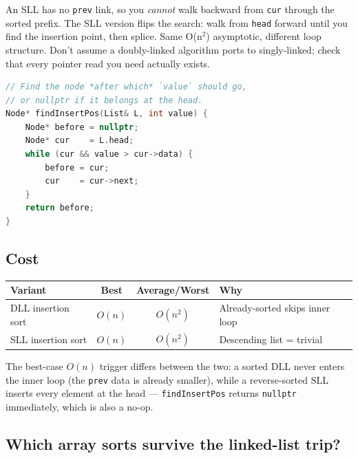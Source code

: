 \documentclass[11pt]{article}
\begin{document}
\begin{warnbox}
An SLL has no \texttt{prev} link, so you \emph{cannot} walk
backward from \texttt{cur} through the sorted prefix. The SLL
version flips the search: walk from \texttt{head} forward until
you find the insertion point, then splice. Same O(n$^2$)
asymptotic, different loop structure. Don't assume a doubly-linked
algorithm ports to singly-linked; check that every pointer read
you need actually exists.
\end{warnbox}

\begin{examplebox}
\begin{lstlisting}[language=C++,basicstyle=\ttfamily\small,frame=single]
// Find the node *after which* `value` should go,
// or nullptr if it belongs at the head.
Node* findInsertPos(List& L, int value) {
    Node* before = nullptr;
    Node* cur    = L.head;
    while (cur && value > cur->data) {
        before = cur;
        cur    = cur->next;
    }
    return before;
}
\end{lstlisting}
\end{examplebox}

\subsection*{Cost}

\begin{center}
\begin{tabular}{|l|c|c|l|}
\hline
\textbf{Variant} & \textbf{Best} & \textbf{Average/Worst} & \textbf{Why} \\
\hline
DLL insertion sort & $O(n)$    & $O(n^2)$ & Already-sorted skips inner loop \\
SLL insertion sort & $O(n)$    & $O(n^2)$ & Descending list = trivial \\
\hline
\end{tabular}
\end{center}

The best-case $O(n)$ trigger differs between the two: a sorted DLL
never enters the inner loop (the \texttt{prev} data is already
smaller), while a reverse-sorted SLL inserts every element at the
head --- \texttt{findInsertPos} returns \texttt{nullptr}
immediately, which is also a no-op.

\subsection*{Which array sorts survive the linked-list trip?}
\end{document}
